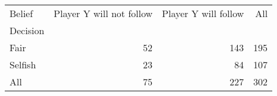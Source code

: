 \begin{tabular}{lrrr}
Belief & Player Y will not follow & Player Y will follow & All \\
Decision &  &  &  \\
Fair & 52 & 143 & 195 \\
Selfish & 23 & 84 & 107 \\
All & 75 & 227 & 302 \\
\end{tabular}
